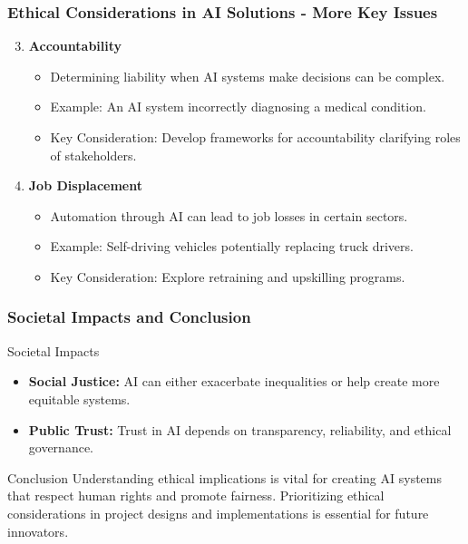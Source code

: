 \documentclass{beamer}
\begin{document}
\begin{frame}[fragile]
    \frametitle{Ethical Considerations in AI Solutions - More Key Issues}
    \begin{enumerate}
        \setcounter{enumi}{2} %
        \item \textbf{Accountability}
            \begin{itemize}
                \item Determining liability when AI systems make decisions can be complex.
                \item Example: An AI system incorrectly diagnosing a medical condition.
                \item Key Consideration: Develop frameworks for accountability clarifying roles of stakeholders.
            \end{itemize}
        
        \item \textbf{Job Displacement}
            \begin{itemize}
                \item Automation through AI can lead to job losses in certain sectors.
                \item Example: Self-driving vehicles potentially replacing truck drivers.
                \item Key Consideration: Explore retraining and upskilling programs.
            \end{itemize}
    \end{enumerate}
\end{frame}

\begin{frame}[fragile]
    \frametitle{Societal Impacts and Conclusion}
    \begin{block}{Societal Impacts}
        \begin{itemize}
            \item \textbf{Social Justice:} AI can either exacerbate inequalities or help create more equitable systems.
            \item \textbf{Public Trust:} Trust in AI depends on transparency, reliability, and ethical governance.
        \end{itemize}
    \end{block}

    \begin{block}{Conclusion}
        Understanding ethical implications is vital for creating AI systems that respect human rights and promote fairness. Prioritizing ethical considerations in project designs and implementations is essential for future innovators.
    \end{block}
\end{frame}
\end{document}
